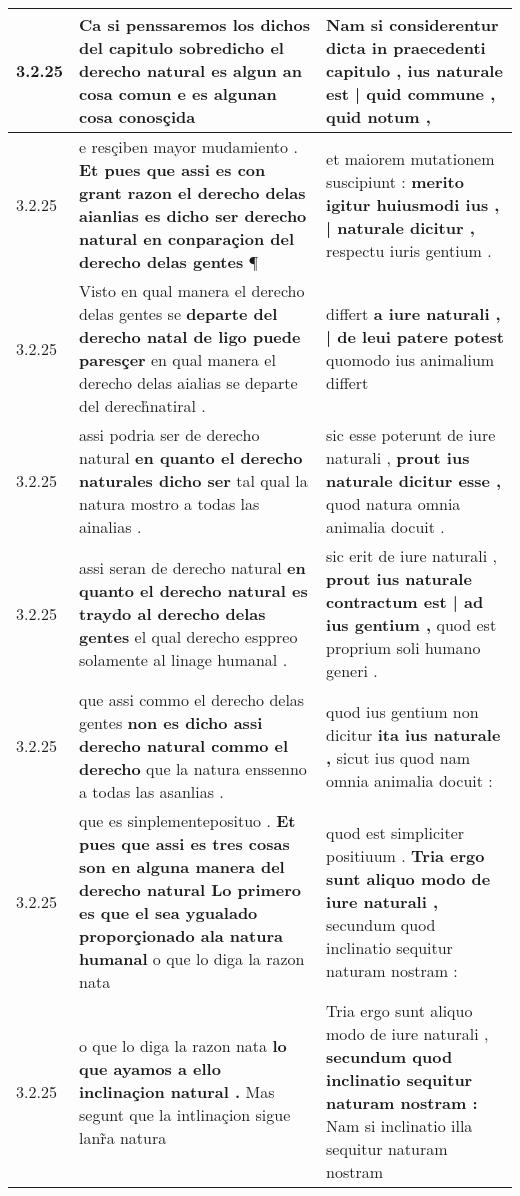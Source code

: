 \begin{tabular}{|p{1cm}|p{6.5cm}|p{6.5cm}|}
3.2.25 & Ca si penssaremos los dichos del capitulo \textbf{ sobredicho el derecho natural es algun an cosa comun } e es algunan cosa conosçida & Nam si considerentur dicta in praecedenti capitulo , \textbf{ ius naturale est | quid commune , } quid notum , \\\hline
3.2.25 & e resçiben mayor mudamiento . \textbf{ Et pues que assi es con grant razon el derecho delas aianlias es dicho ser derecho natural en conparaçion del derecho delas gentes } ¶ & et maiorem mutationem suscipiunt : \textbf{ merito igitur huiusmodi ius , | naturale dicitur , } respectu iuris gentium . \\\hline
3.2.25 & Visto en qual manera el derecho delas gentes se \textbf{ departe del derecho natal de ligo puede paresçer } en qual manera el derecho delas aialias se departe del derech̉natiral . & differt \textbf{ a iure naturali , | de leui patere potest } quomodo ius animalium differt \\\hline
3.2.25 & assi podria ser de derecho natural \textbf{ en quanto el derecho naturales dicho ser } tal qual la natura mostro a todas las ainalias . & sic esse poterunt de iure naturali , \textbf{ prout ius naturale dicitur esse , } quod natura omnia animalia docuit . \\\hline
3.2.25 & assi seran de derecho natural \textbf{ en quanto el derecho natural es traydo al derecho delas gentes } el qual derecho esppreo solamente al linage humanal . & sic erit de iure naturali , \textbf{ prout ius naturale contractum est | ad ius gentium , } quod est proprium soli humano generi . \\\hline
3.2.25 & que assi commo el derecho delas gentes \textbf{ non es dicho assi derecho natural commo el derecho } que la natura enssenno a todas las asanlias . & quod ius gentium non dicitur \textbf{ ita ius naturale , } sicut ius quod nam omnia animalia docuit : \\\hline
3.2.25 & que es sinplementeposituo . \textbf{ Et pues que assi es tres cosas son en alguna manera del derecho natural Lo primero es que el sea ygualado proporçionado ala natura humanal } o que lo diga la razon nata & quod est simpliciter positiuum . \textbf{ Tria ergo sunt aliquo modo de iure naturali , } secundum quod inclinatio sequitur naturam nostram : \\\hline
3.2.25 & o que lo diga la razon nata \textbf{ lo que ayamos a ello inclinaçion natural . } Mas segunt que la intlinaçion sigue lanr̃a natura & Tria ergo sunt aliquo modo de iure naturali , \textbf{ secundum quod inclinatio sequitur naturam nostram : } Nam si inclinatio illa sequitur naturam nostram \\\hline

\end{tabular}

